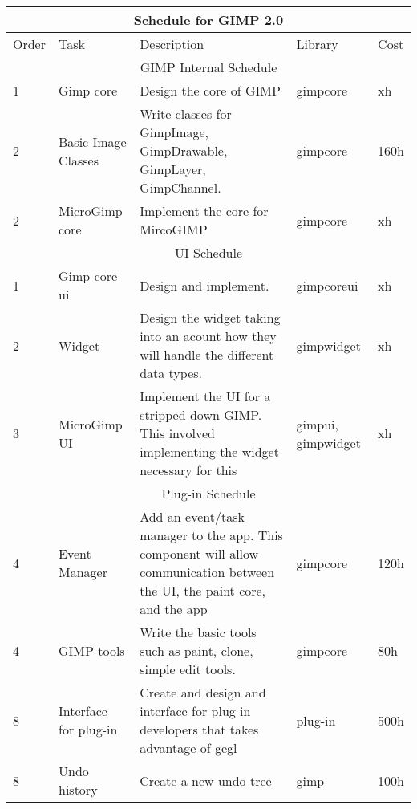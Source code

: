 \begin{flushleft}		
\begin{tabular}{|l|p{3cm}|p{5cm}|p{2cm}|l|}\hline
\multicolumn{5}{|c|}{\rule[-3mm]{0mm}{8mm} \large \bf Schedule for GIMP 2.0}\\  
\hline
Order & Task & Description & Library & Cost\\ 
\hline 

\hline
\multicolumn{5}{|c|}{GIMP Internal Schedule}\\
\hline 
1 & Gimp core & Design the core of GIMP & gimpcore & xh\\
\hline
2 & Basic Image Classes & Write classes for GimpImage, GimpDrawable, GimpLayer, GimpChannel. & gimpcore & 160h\\
\hline 
2 & MicroGimp core & Implement the core for MircoGIMP & gimpcore & xh\\
\hline

\multicolumn{5}{|c|}{UI Schedule}\\
\hline 
1 & Gimp core ui & Design and implement. & gimpcoreui & xh\\
\hline
2 & Widget & Design the widget taking into an acount how they will handle the different data types. & gimpwidget &xh\\
\hline
3 & MicroGimp UI & Implement the UI for a stripped down GIMP. This involved implementing the widget necessary for this& gimpui, gimpwidget & xh\\
\hline


\multicolumn{5}{|c|}{Plug-in Schedule}\\
\hline 
4 & Event Manager & Add an event/task manager to the app. This component will allow communication between the UI, the paint core, and the app & gimpcore & 120h\\
\hline 
4 & GIMP tools & Write the basic tools such as paint, clone, simple edit tools. & gimpcore & 80h\\
\hline
8 & Interface for plug-in & Create and design and interface for plug-in developers that takes advantage of gegl & plug-in & 500h\\
\hline
8 & Undo history & Create a new undo tree & gimp & 100h\\
\hline


\end{tabular}
\end{flushleft}
